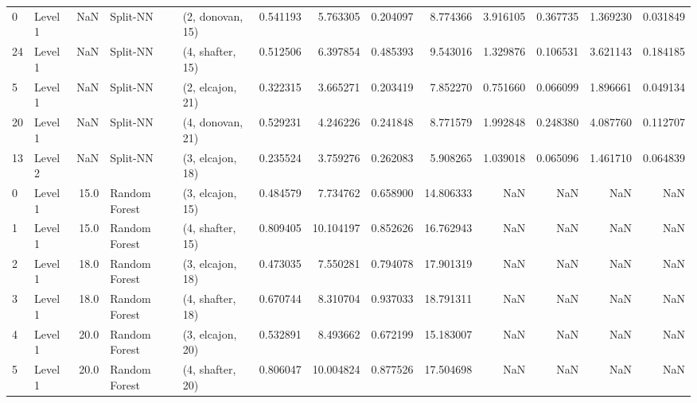 \begin{tabular}{llrllrrrrrrrr}
0  &   Level 1 &    NaN &       Split-NN &  (2, donovan, 15) &   0.541193 &   5.763305 &  0.204097 &   8.774366 &             3.916105 &               0.367735 &            1.369230 &              0.031849 \\
24 &   Level 1 &    NaN &       Split-NN &  (4, shafter, 15) &   0.512506 &   6.397854 &  0.485393 &   9.543016 &             1.329876 &               0.106531 &            3.621143 &              0.184185 \\
5  &   Level 1 &    NaN &       Split-NN &  (2, elcajon, 21) &   0.322315 &   3.665271 &  0.203419 &   7.852270 &             0.751660 &               0.066099 &            1.896661 &              0.049134 \\
20 &   Level 1 &    NaN &       Split-NN &  (4, donovan, 21) &   0.529231 &   4.246226 &  0.241848 &   8.771579 &             1.992848 &               0.248380 &            4.087760 &              0.112707 \\
13 &   Level 2 &    NaN &       Split-NN &  (3, elcajon, 18) &   0.235524 &   3.759276 &  0.262083 &   5.908265 &             1.039018 &               0.065096 &            1.461710 &              0.064839 \\
0  &   Level 1 &   15.0 &  Random Forest &  (3, elcajon, 15) &   0.484579 &   7.734762 &  0.658900 &  14.806333 &                  NaN &                    NaN &                 NaN &                   NaN \\
1  &   Level 1 &   15.0 &  Random Forest &  (4, shafter, 15) &   0.809405 &  10.104197 &  0.852626 &  16.762943 &                  NaN &                    NaN &                 NaN &                   NaN \\
2  &   Level 1 &   18.0 &  Random Forest &  (3, elcajon, 18) &   0.473035 &   7.550281 &  0.794078 &  17.901319 &                  NaN &                    NaN &                 NaN &                   NaN \\
3  &   Level 1 &   18.0 &  Random Forest &  (4, shafter, 18) &   0.670744 &   8.310704 &  0.937033 &  18.791311 &                  NaN &                    NaN &                 NaN &                   NaN \\
4  &   Level 1 &   20.0 &  Random Forest &  (3, elcajon, 20) &   0.532891 &   8.493662 &  0.672199 &  15.183007 &                  NaN &                    NaN &                 NaN &                   NaN \\
5  &   Level 1 &   20.0 &  Random Forest &  (4, shafter, 20) &   0.806047 &  10.004824 &  0.877526 &  17.504698 &                  NaN &                    NaN &                 NaN &                   NaN \\

\end{tabular}

